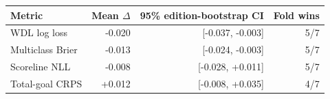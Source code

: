 \begin{tabularx}{\linewidth}{@{}Yrrr@{}}
\toprule
Metric & Mean $\Delta$ & 95\% edition-bootstrap CI & Fold wins \\
\midrule
WDL log loss & -0.020 & [-0.037, -0.003] & 5/7 \\
Multiclass Brier & -0.013 & [-0.024, -0.003] & 5/7 \\
Scoreline NLL & -0.008 & [-0.028, +0.011] & 5/7 \\
Total-goal CRPS & +0.012 & [-0.008, +0.035] & 4/7 \\
\bottomrule
\end{tabularx}
